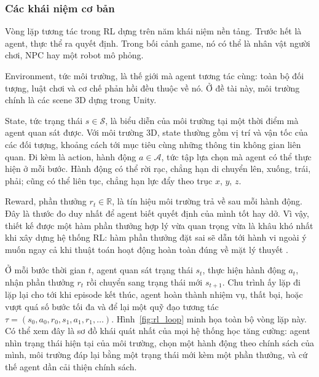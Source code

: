 \subsubsection{Các khái niệm cơ bản}

\indent Vòng lặp tương tác trong RL dựng trên năm khái niệm nền tảng. Trước hết là
agent, thực thể ra quyết định. Trong bối cảnh game, nó có thể là nhân vật người chơi,
NPC hay một robot mô phỏng.

\indent Environment, tức môi trường, là thế giới mà agent tương tác cùng: toàn bộ đối
tượng, luật chơi và cơ chế phản hồi đều thuộc về nó. Ở đề tài này, môi trường chính là
các scene 3D dựng trong Unity.

\indent State, tức trạng thái $s \in \mathcal{S}$, là biểu diễn của môi trường tại một
thời điểm mà agent quan sát được. Với môi trường 3D, state thường gồm vị trí và vận tốc
của các đối tượng, khoảng cách tới mục tiêu cùng những thông tin không gian liên quan.
Đi kèm là action, hành động $a \in \mathcal{A}$, tức tập lựa chọn mà agent có thể thực hiện ở
mỗi bước. Hành động có thể rời rạc, chẳng hạn di chuyển lên, xuống, trái, phải; cũng có
thể liên tục, chẳng hạn lực đẩy theo trục $x$, $y$, $z$.

\indent Reward, phần thưởng $r_t \in \mathbb{R}$, là tín hiệu môi trường trả về sau mỗi
hành động. Đây là thước đo duy nhất để agent biết quyết định của mình tốt hay dở. Vì vậy, thiết
kế được một hàm phần thưởng hợp lý vừa quan trọng vừa là khâu khó nhất khi xây
dựng hệ thống RL: hàm phần thưởng đặt sai sẽ dẫn tới hành vi ngoài ý muốn ngay cả khi
thuật toán hoạt động hoàn toàn đúng về mặt lý thuyết \cite{sutton2018reinforcement}.

\indent Ở mỗi bước thời gian $t$, agent quan sát trạng thái $s_t$, thực hiện hành động
$a_t$, nhận phần thưởng $r_t$ rồi chuyển sang trạng thái mới $s_{t+1}$. Chu trình ấy lặp
đi lặp lại cho tới khi episode kết thúc, agent hoàn thành nhiệm vụ, thất bại, hoặc vượt
quá số bước tối đa và để lại một quỹ đạo tương tác $\tau = (s_0, a_0, r_0, s_1, a_1,
r_1, \ldots)$. Hình~\ref{fig:rl_loop} minh họa toàn bộ vòng lặp này. Có thể xem đây là sơ
đồ khái quát nhất của mọi hệ thống học tăng cường: agent nhìn trạng thái hiện tại của môi
trường, chọn một hành động theo chính sách của mình, môi trường đáp lại bằng một trạng
thái mới kèm một phần thưởng, và cứ thế agent dần cải thiện chính sách.

